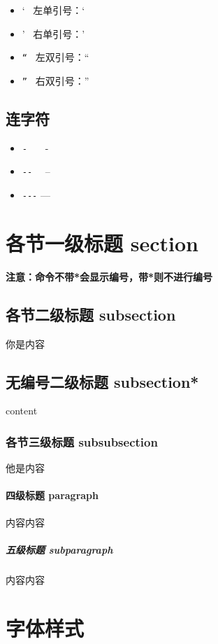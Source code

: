 \begin{itemize}
    \item  ‘  \ \quad 左单引号：‘ 
    \item  ’  \ \quad 右单引号：’ 
    \item  \verb|“| \ \quad 左双引号：“ 
    \item  \verb|”| \ \quad 右双引号：” 
\end{itemize}

 \subsection{连字符}

\begin{itemize}
    \item \verb|-| \ \ \ \quad -
    \item \verb|--| \ \ \quad --
    \item \verb|---| \quad ---
\end{itemize}

\section{各节一级标题 section}

\textbf{注意：命令不带*会显示编号，带*则不进行编号}

\subsection{各节二级标题 subsection}
你是内容

\subsection*{无编号二级标题 subsection*}
content

\subsubsection{各节三级标题 subsubsection}
他是内容

\paragraph{四级标题 paragraph}
内容内容

\subparagraph{五级标题 subparagraph}
内容内容

\section{字体样式}

